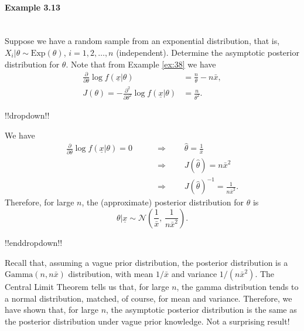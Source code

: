 \paragraph{Example 3.13}{~\\
Suppose we have a random sample from an exponential distribution, that is, $X_i|\theta\sim \mathrm{Exp}(\theta)$, $i=1,2,\ldots,n$ (independent). Determine the asymptotic posterior distribution for $\theta$. Note that from Example \ref{ex:38} we have
\begin{align*}
\frac{\partial}{\partial\theta} \log
f(\underline{x}|\theta)&=\frac{n}{\theta}-n\bar x , \\
J(\theta)=-\frac{\partial^2}{\partial\theta^2} \log
f(\underline{x}|\theta)&=\frac{n}{\theta^2}.
\end{align*}

!!dropdown!!

We have
    \begin{align*}
    \frac{\partial}{\partial\theta} \log f(\underline{x}|\theta)=0
    \quad\quad&\Longrightarrow\quad\quad
    \hat\theta=\frac{1}{\bar x} \\
    &\Longrightarrow\quad\quad
    J(\hat\theta)=n\bar x^2 \\
    &\Longrightarrow\quad\quad
    J(\hat\theta)^{-1}=\frac{1}{n\bar x^2}.
    \end{align*}
    Therefore, for large $n$, the (approximate) posterior distribution for $\theta$ is
    $$
    \theta|\underline{x}\sim \mathcal{N}\left(\frac{1}{\bar x},\,\frac{1}{n\bar x^2}\right).
    $$

!!enddropdown!!

Recall that, assuming a vague prior distribution, the posterior
distribution is a $\mathrm{Gamma}(n,n\bar x)$ distribution, with mean $1/\bar x$
and variance $1/(n\bar x^2)$. The Central Limit Theorem tells us that,
for large $n$, the gamma distribution tends to a normal distribution,
matched, of course, for mean and variance. Therefore, we have shown
that, for large $n$, the asymptotic posterior distribution is the same
as the posterior distribution under vague prior knowledge. Not a
surprising result!}



